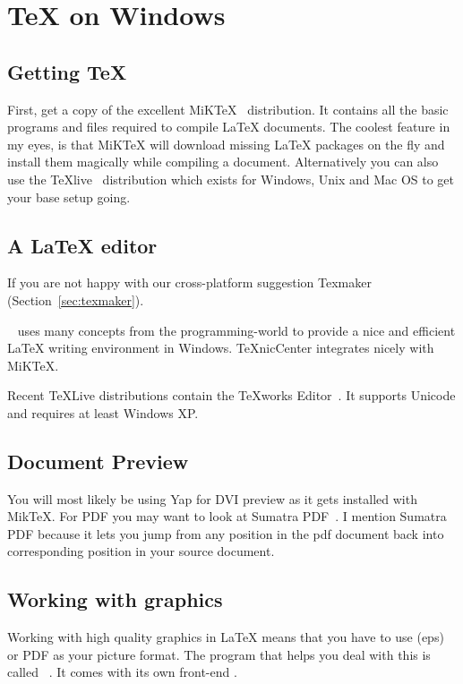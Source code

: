\section{\TeX{} on Windows}

\subsection{Getting \TeX{}}

First, get a copy of the excellent MiK\TeX{}~\cite{miktex} distribution.
It contains all the basic programs and files
required to compile \LaTeX{} documents.  The coolest feature in my eyes, is
that MiK\TeX{} will download missing \LaTeX{} packages on the fly and install them
magically while compiling a document. Alternatively you can also use
the TeXlive~\cite{texlive} distribution which exists for Windows, Unix and Mac OS to
get your base setup going.

\subsection{A \LaTeX{} editor}

If you are not happy with our cross-platform suggestion Texmaker (Section~\ref{sec:texmaker}).

~\cite{texniccenter} uses many concepts from the programming-world to provide a nice and
efficient \LaTeX{} writing environment in Windows. TeXnicCenter integrates nicely with
MiKTeX.

Recent \TeX{}Live distributions contain the \TeX{}works Editor~\cite{texworks}.
It supports Unicode and requires at least Windows XP\@.

\subsection{Document Preview}

You will most likely be using Yap for DVI preview as it gets installed with
MikTeX. For PDF you may want to look at Sumatra
PDF~\cite{sumatrapdf}. I mention Sumatra PDF
because it lets you jump from any position in the pdf document back into
corresponding position in your source document.

\subsection{Working with graphics}

Working with high quality graphics in \LaTeX{} means that you have to use
\EPSi{} (eps) or PDF as your picture format. The program that helps you
deal with this is called ~\cite{ghostscript}. It comes with its
own front-end .

